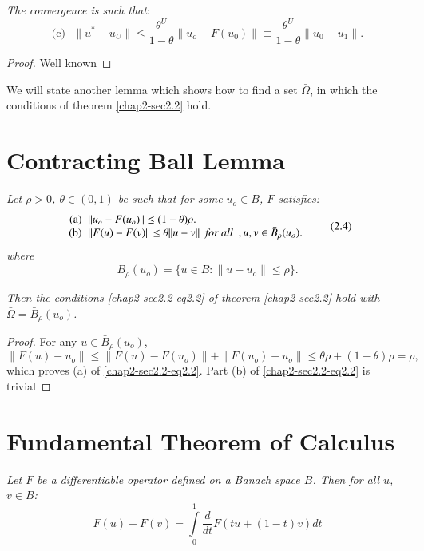 \textit{The convergence is such that}:
\setcounter{equation}{2}
\begin{equation*}
\text{(c)~ }  \|u^{*} - u_{U}\| \le \frac{\theta^{U}}{1-\theta} \|
u_{o} - F(u_{0})\| \equiv \frac{\theta^{U}}{1-\theta} \| u_{0} -
u_{1}\|.  \tag{2.3}\label{chap2-sec2.2-addeq2.3} 
\end{equation*}

\begin{proof}
Well known
\end{proof}

We will state another lemma which shows how to find a set $\bar{\Omega}$, in
which the conditions of theorem \eqref{chap2-sec2.2} hold. 


\setcounter{section}{3}
\section{Contracting Ball Lemma}\label{chap2-sec2.4} 

\textit{Let $\rho > 0$, $\theta \in (0,1)$  be such that for
  some $u_{o} \in B$, $F$ satisfies:} 
\begin{equation*}
\begin{array}{r@{\;\;}l}
\text{(a)} & \|u_{o}-F(u_{o})\| \le (1-\theta) \rho.\\ 
\text{(b)} & \|F(u) - F(v)\| \le \theta \| u-v\| \textit{ \ for
  all \ }, u, v \in \bar{B}_{\rho}(u_{o}). 
\end{array}
\tag{2.4}\label{chap2-sec2.4-eq2.4} 
\end{equation*}
\textit{where}
$$
\bar{B}_{\rho}(u_{o}) = \{u \in B : \| u-u_{o}\| \le \rho\}. 
$$

\textit{Then the conditions \eqref{chap2-sec2.2-eq2.2}  of theorem
  \eqref{chap2-sec2.2} hold with $\bar{\Omega} = \bar{B}_{\rho}(u_{o})$.} 

\begin{proof}
For any $u \in \bar{B}_{\rho}(u_{o})$, 
$$
\|F(u) - u_{o}\| \le \|F(u) -F(u_{o})\| + \|F(u_{o}) - u_{o}\| \le
\theta \rho+ (1-\theta)\rho = \rho, 
$$
which proves (a) of \eqref{chap2-sec2.2-eq2.2}. Part (b) of
\eqref{chap2-sec2.2-eq2.2} is trivial 
\end{proof}

\section{Fundamental Theorem of Calculus}\label{chap2-sec2.5}
\pageoriginale%

\textit{Let $F$ be a differentiable operator defined on a
  Banach space $B$. Then for all $u$, $v \in B$:}
\begin{equation*}
F(u) - F(v) = \int\limits^{1}_{0} \frac{d}{dt} F(tu+(1-t)v)dt
\tag{2.5}\label{chap2-sec2.5-eq2.5}   
 \end{equation*} 

